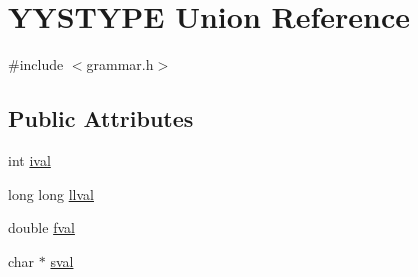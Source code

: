 \hypertarget{unionYYSTYPE}{\section{Y\-Y\-S\-T\-Y\-P\-E Union Reference}
\label{unionYYSTYPE}
}


{\ttfamily \#include $<$grammar.\-h$>$}

\subsection*{Public Attributes}
\begin{DoxyCompactItemize}
\item 
int \hyperlink{unionYYSTYPE_ae9d3f6cba410d8f367f34437acf8c9a2}{ival}
\item 
long long \hyperlink{unionYYSTYPE_a943fdbe79b7f976c66089ab5170dff54}{llval}
\item 
double \hyperlink{unionYYSTYPE_a31eb6403902c1580af29230db1ecc872}{fval}
\item 
char $\ast$ \hyperlink{unionYYSTYPE_a73a5074a72319891e5442106deeb667b}{sval}
\end{DoxyCompactItemize}


